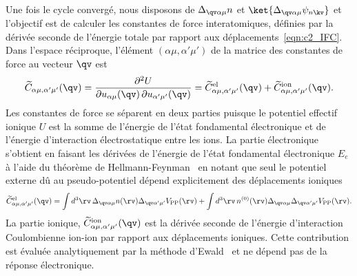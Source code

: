 Une fois le cycle convergé, nous disposons de $\Delta_{\qv\alpha\mu}n$ et $\ket{\Delta_{\qv\alpha\mu}\psi_{n\kv}}$ et l'objectif est de calculer les constantes de force interatomiques, définies par la dérivée seconde de l'énergie totale par rapport aux déplacements~\eqref{eqn:c2_IFC}. Dans l'espace réciproque, l'élément $(\alpha\mu,\alpha'\mu')$ de la matrice des constantes de force au vecteur $\qv$ est
\begin{equation}
        \widetilde{C}_{\alpha\mu,\alpha'\mu'}(\qv)
    =\frac{\partial^2 U}
    {\partial u_{\alpha\mu}(\qv)\,\partial u_{\alpha'\mu'}(\qv)} = \widetilde{C}^{\text{el}}_{\alpha\mu,\alpha'\mu'}(\qv)+\widetilde{C}^{\text{ion}}_{\alpha\mu,\alpha'\mu'}(\qv).
    \label{eqn:c2_IFCq}
\end{equation}
Les constantes de force se séparent en deux parties puisque le potentiel effectif ionique $U$ est la somme de l'énergie de l'état fondamental électronique et de l'énergie d'interaction électrostatique entre les ions. La partie électronique s'obtient en faisant les dérivées de l'énergie de l'état fondamental électronique $E_e$ à l'aide du théorème de Hellmann-Feynman~\cite{EinfuhrungQuantenchemieHellmann1941,feynmanForcesMolecules1939} en notant que seul le potentiel externe dû au pseudo-potentiel dépend explicitement des déplacements ioniques
\begin{equation}
    \widetilde{C}^\text{el}_{\alpha\mu,\alpha'\mu'}(\qv)= \int d^3\rv\,\Delta_{\qv\alpha\mu}n(\rv)\Delta_{\qv\alpha'\mu'}V_\text{PP}(\rv)+\int d^3\rv\,n^{(0)}(\rv)\Delta_{\qv\alpha\mu}\Delta_{\qv\alpha'\mu'}V_\text{PP}(\rv).
\end{equation}
La partie ionique, $\widetilde{C}^{\text{ion}}_{\alpha\mu,\alpha'\mu'}(\qv)$ est la dérivée seconde de l'énergie d'interaction Coulombienne ion-ion par rapport aux déplacements ioniques. Cette contribution est évaluée analytiquement par la méthode d'Ewald~\cite{ewaldBerechnungOptischerUnd1921} et ne dépend pas de la réponse électronique. 

